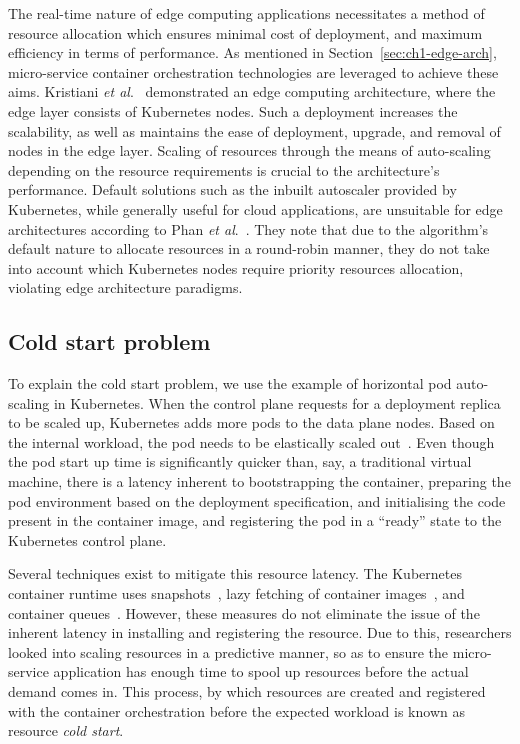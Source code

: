 The real-time nature of edge computing applications necessitates a method of resource allocation which ensures minimal cost of deployment, and maximum efficiency in terms of performance. As mentioned in Section~\ref{sec:ch1-edge-arch}, micro-service container orchestration technologies are leveraged to achieve these aims. Kristiani \textit{et al}.~\cite{kristiani2019} demonstrated an edge computing architecture, where the edge layer consists of Kubernetes nodes. Such a deployment increases the scalability, as well as maintains the ease of deployment, upgrade, and removal of nodes in the edge layer. Scaling of resources through the means of auto-scaling depending on the resource requirements is crucial to the architecture's performance. Default solutions such as the inbuilt autoscaler provided by Kubernetes, while generally useful for cloud applications, are unsuitable for edge architectures according to Phan \textit{et al}.~\cite{phan2022traffic}. They note that due to the algorithm's default nature to allocate resources in a round-robin manner, they do not take into account which Kubernetes nodes require priority resources allocation, violating edge architecture paradigms.

\subsection{Cold start problem}
\label{subsec:ch3-cold-start}

To explain the cold start problem, we use the example of horizontal pod auto-scaling in Kubernetes. When the control plane requests for a deployment replica to be scaled up, Kubernetes adds more pods to the data plane nodes.  Based on the internal workload, the pod needs to be elastically scaled out~\cite{beni2021reducing}. Even though the pod start up time is significantly quicker than, say, a traditional virtual machine, there is a latency inherent to bootstrapping the container, preparing the pod environment based on the deployment specification, and initialising the code present in the container image, and registering the pod in a ``ready'' state to the Kubernetes control plane.\par

Several techniques exist to mitigate this resource latency. The Kubernetes container runtime uses snapshots~\cite{cadden2019seuss}, lazy fetching of container images~\cite{lorenzo2019fogdocker}, and container queues~\cite{lin2019mitigating}. However, these measures do not eliminate the issue of the inherent latency in installing and registering the resource. Due to this, researchers looked into scaling resources in a predictive manner, so as to ensure the micro-service application has enough time to spool up resources before the actual demand comes in. This process, by which resources are created and registered with the container orchestration before the expected workload is known as resource \textit{cold start}.\par

